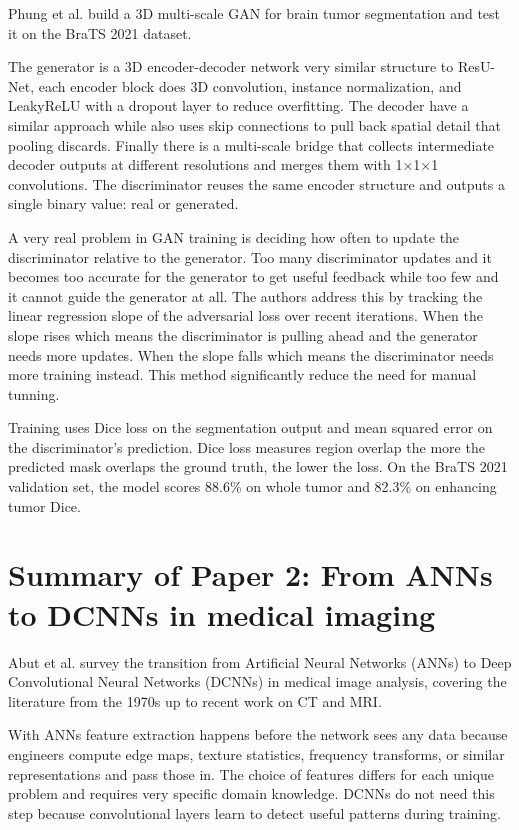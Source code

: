 \documentclass[12pt]{extreport}
\begin{document}
Phung et al. \cite{paper2022} build a 3D multi-scale GAN for brain tumor segmentation and test it on the BraTS 2021 dataset.

The generator is a 3D encoder-decoder network very similar structure to ResU-Net, each encoder block does 3D convolution, instance normalization, and LeakyReLU with a dropout layer to reduce overfitting. The decoder have a similar approach while also uses skip connections to pull back spatial detail that pooling discards. Finally there is a multi-scale bridge that collects intermediate decoder outputs at different resolutions and merges them with 1$\times$1$\times$1 convolutions. The discriminator reuses the same encoder structure and outputs a single binary value: real or generated.

A very real problem in GAN training is deciding how often to update the discriminator relative to the generator. Too many discriminator updates and it becomes too accurate for the generator to get useful feedback while too few and it cannot guide the generator at all. The authors address this by tracking the linear regression slope of the adversarial loss over recent iterations. When the slope rises which means the discriminator is pulling ahead and the generator needs more updates. When the slope falls which means the discriminator needs more training instead. This method significantly reduce the need for manual tunning.

Training uses Dice loss on the segmentation output and mean squared error on the discriminator's prediction. Dice loss measures region overlap the more the predicted mask overlaps the ground truth, the lower the loss. On the BraTS 2021 validation set, the model scores 88.6\% on whole tumor and 82.3\% on enhancing tumor Dice.

\section{Summary of Paper 2: From ANNs to DCNNs in medical imaging}

Abut et al. \cite{paper2023} survey the transition from Artificial Neural Networks (ANNs) to Deep Convolutional Neural Networks (DCNNs) in medical image analysis, covering the literature from the 1970s up to recent work on CT and MRI.

With ANNs feature extraction happens before the network sees any data because engineers compute edge maps, texture statistics, frequency transforms, or similar representations and pass those in. The choice of features differs for each unique problem and requires very specific domain knowledge. DCNNs do not need this step because convolutional layers learn to detect useful patterns during training.
\end{document}
